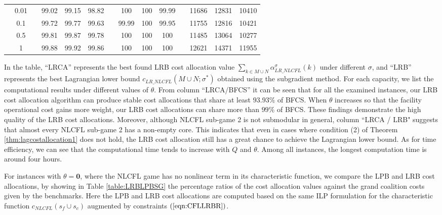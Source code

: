 \documentclass[ijoc,nonblindrev]{informs3} %
\begin{document}
\begin{table}[H]
\begin{tabular}[!h]{c c c c c c c c c c c c c c}
&0.01  &  &99.02	&99.15	&98.82	&	&100	&100	&99.99	&	&11686	&12831	&10410\\

&0.1  &  &99.72	&99.77	&99.63	&	&99.99	&100	&99.95	&	&11755	&12816	&10421\\

&0.5  &  &99.81	&99.87	&99.78	&	&100	&100	&100	&	&11485	&13064	&10277\\

&1  &  &99.88	&99.92	&99.86	&	&100	&100	&100	&	&12621	&14371	&11955\\
\hline
\end{tabular}
\vspace{-3mm}
\end{table}



In the table, ``LRCA'' represents the best found LRB cost allocation value $\sum_{k \in M \cup N}\alpha_{LR\_NLCFL}^{\sigma}(k)$ under different $\sigma$, and ``LRB'' represents the best Lagrangian lower bound $c_{LR\_NLCFL}(M \cup N; \sigma^*)$ obtained using the subgradient method. For each capacity, we list the computational results under different values of $\theta$.
From column ``LRCA/BFCS'' it can be seen that for all the examined instances, our LRB cost allocation algorithm can produce stable cost allocations that share at least $93.93\%$ of BFCS. When  $\theta$ increases so that the facility operational cost gains more weight, our LRB cost allocations can share more than $99\%$ of BFCS.
These findings demonstrate the high quality of the LRB cost allocations.
Moreover, although NLCFL sub-game 2 is not submodular in general, column ``LRCA / LRB" suggests that almost every NLCFL sub-game 2 has a non-empty core.
This indicates that even in cases where condition (2) of Theorem \ref{thm:lagcostallocation1} does not hold, the LRB cost allocation still has a great chance to achieve the Lagrangian lower bound.
As for time efficiency, we can see that the computational time tends to increase with $Q$ and $\theta$. Among all instances, the longest computation time is around four hours.


For instances with $\theta=\textbf{0}$, where the NLCFL game has no nonlinear term in its characteristic function, we compare the LPB and LRB cost allocations, by showing in Table \ref{table:LRBLPBSG} the percentage ratios of the cost allocation values against the grand coalition costs given by the benchmarks. Here the LPB and LRB cost allocations are computed based on the same ILP formulation for the characteristic function $c_{NLCFL}(s_f \cup s_c)$ augmented by constraints $(\ref{eqn:CFLLRBR})$.
\end{document}
